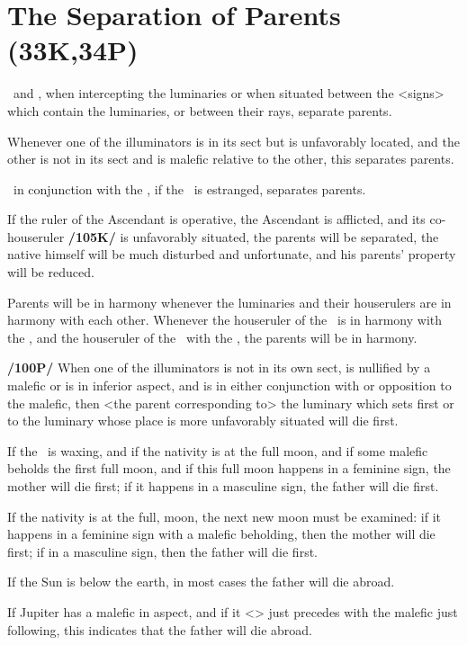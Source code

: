 \section{The Separation of Parents (33K,34P)}

\Mars\, and \Saturn, when intercepting the luminaries or when situated between the <signs> which contain the luminaries, or between their rays, separate parents. 

Whenever one of the illuminators is in its sect but is unfavorably located, and the other is not in its sect and is malefic relative to the other, this separates parents. 

\Saturn\, in conjunction with the \Sun, if the \Moon\, is estranged, separates parents. 

If the ruler of the Ascendant is operative, the Ascendant is afflicted, and its co-houseruler \textbf{/105K/} is unfavorably
situated, the parents will be separated, the native himself will be much disturbed and unfortunate, and his parents’ property will be reduced. 

Parents will be in harmony whenever the luminaries and their
houserulers are in harmony with each other. Whenever the houseruler of the \Sun\, is in harmony with the \Moon, and the houseruler of the \Moon\, with the \Sun, the parents will be in harmony.

\textbf{/100P/} When one of the illuminators is not in its own sect, is nullified by a malefic or is in inferior aspect, and is in either conjunction with or opposition to the malefic, then <the parent corresponding to> the luminary which sets first or to the luminary whose place is more unfavorably situated will die first. 

If the \Moon\, is waxing, and if the nativity is at the full moon, and if some malefic beholds the first full moon,
and if this full moon happens in a feminine sign, the mother will die first; if it happens in a masculine sign, the father will die first. 

If the nativity is at the full, moon, the next new moon must be examined: if it happens in a feminine sign with a malefic beholding, then the mother will die first; if in a masculine sign, then the father will die first.

If the Sun is below the earth, in most cases the father will die abroad. 

If Jupiter has a malefic in aspect, and if it <\Jupiter> just precedes with the malefic just following, this indicates that the father will die abroad. 

